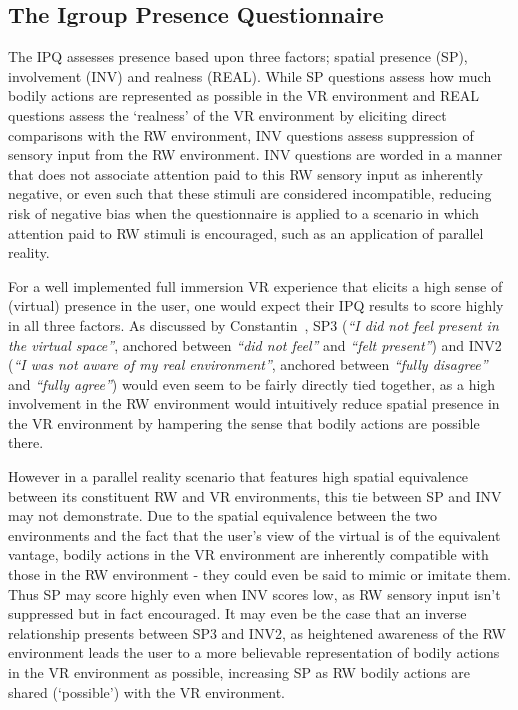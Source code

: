 
\subsection{The Igroup Presence Questionnaire}
\label{igroup-presence-questionnaire-explanation}
The IPQ assesses presence based upon three factors; spatial presence (SP), involvement (INV) and realness (REAL). While SP questions assess how much bodily actions are represented as possible in the VR environment and REAL questions assess the `realness' of the VR environment by eliciting direct comparisons with the RW environment, INV questions assess suppression of sensory input from the RW environment. INV questions are worded in a manner that does not associate attention paid to this RW sensory input as inherently negative, or even such that these stimuli are considered incompatible, reducing risk of negative bias when the questionnaire is applied to a scenario in which attention paid to RW stimuli is encouraged, such as an application of parallel reality.

For a well implemented full immersion VR experience that elicits a high sense of (virtual) presence in the user, one would expect their IPQ results to score highly in all three factors. As discussed by Constantin~\cite{Constantin2003}, SP3 (\textit{``I did not feel present in the virtual space''}, anchored between \textit{``did not feel''} and \textit{``felt present''}) and INV2 (\textit{``I was not aware of my real environment''}, anchored between \textit{``fully disagree''} and \textit{``fully agree''}) would even seem to be fairly directly tied together, as a high involvement in the RW environment would intuitively reduce spatial presence in the VR environment by hampering the sense that bodily actions are possible there.

However in a parallel reality scenario that features high spatial equivalence between its constituent RW and VR environments, this tie between SP and INV may not demonstrate. Due to the spatial equivalence between the two environments and the fact that the user's view of the virtual is of the equivalent vantage, bodily actions in the VR environment are inherently compatible with those in the RW environment - they could even be said to mimic or imitate them. Thus SP may score highly even when INV scores low, as RW sensory input isn't suppressed but in fact encouraged. It may even be the case that an inverse relationship presents between SP3 and INV2, as heightened awareness of the RW environment leads the user to a more believable representation of bodily actions in the VR environment as possible, increasing SP as RW bodily actions are shared (`possible') with the VR environment.

